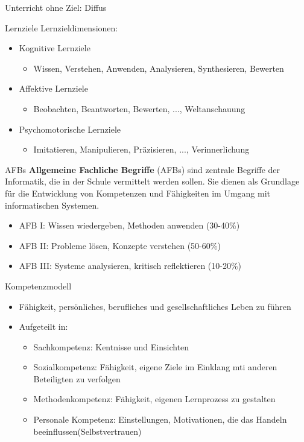 \documentclass{article}
\begin{document}
Unterricht ohne Ziel: Diffus

\begin{block}{Lernziele}
    Lernzieldimensionen:
    \begin{itemize}
        \item Kognitive Lernziele
        \begin{itemize}
            \item Wissen, Verstehen, Anwenden, Analysieren, Synthesieren, Bewerten
        \end{itemize}
        \item Affektive Lernziele
        \begin{itemize}
            \item Beobachten, Beantworten, Bewerten, ..., Weltanschauung
        \end{itemize}
        \item Psychomotorische Lernziele
        \begin{itemize}
            \item Imitatieren, Manipulieren, Präzisieren, ..., Verinnerlichung
        \end{itemize}
    \end{itemize}
\end{block}

\begin{block}{AFBs}
    \textbf{Allgemeine Fachliche Begriffe} (AFBs) sind zentrale Begriffe der Informatik, die in der Schule vermittelt werden sollen. Sie dienen als Grundlage für die Entwicklung von Kompetenzen und Fähigkeiten im Umgang mit informatischen Systemen.
    \begin{itemize}
        \item AFB I: Wissen wiedergeben, Methoden anwenden (30-40\%)
        \item AFB II: Probleme lösen, Konzepte verstehen (50-60\%)
        \item AFB III: Systeme analysieren, kritisch reflektieren (10-20\%)
    \end{itemize}
\end{block}

\begin{block}{Kompetenzmodell}
    \begin{itemize}
        \item Fähigkeit, persönliches, berufliches und gesellschaftliches Leben zu führen
        \item Aufgeteilt in:
        \begin{itemize}
            \item Sachkompetenz: Kentnisse und Einsichten
            \item Sozialkompetenz: Fähigkeit, eigene Ziele im Einklang mti anderen Beteiligten zu verfolgen
            \item Methodenkompetenz: Fähigkeit, eigenen Lernprozess zu gestalten
            \item Personale Kompetenz: Einstellungen, Motivationen, die das Handeln beeinflussen(Selbstvertrauen)
        \end{itemize}
    \end{itemize}
\end{block}
\end{document}
